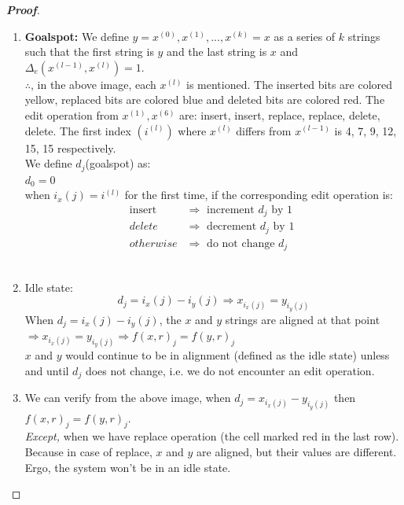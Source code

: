 \documentclass{article}
\begin{document}
\begin{proof}[\textbf{Proof}]
\begin{enumerate}
        \item \textbf{Goalspot:}
        We define $y=x^{(0)},x^{(1)},...,x^{(k)}=x$ as a series of $k$ strings
        such that the first string is $y$ and the last string is $x$ and 
        $\Delta_e(x^{(l-1)},x^{(l)})=1$.\\
        $\therefore$, in the above image, each $x^{(l)}$ is mentioned. The
        inserted bits are colored yellow, replaced bits are colored blue and 
        deleted bits are colored red. The edit operation from $x^{(1)},x^{(6)}$
        are: insert, insert, replace, replace, delete, delete. The first index $(i^{(l)})$
        where $x^{(l)}$ differs from $x^{(l-1)}$ is 4, 7, 9, 12, 15, 15 respectively.\\
        We define $d_j$(goalspot) as:\\
        $d_0=0$ \\
        when $i_x(j)=i^{(l)}$ for the first time, if the corresponding edit
        operation is:\\
        \begin{align}
            \text{insert } &\Longrightarrow \text{ increment } d_j \text{ by 1} \nonumber\\ 
            delete &\Longrightarrow \text{ decrement } d_j \text{ by 1 } \nonumber\\
            otherwise &\Longrightarrow \text{ do not change } d_j \nonumber
        \end{align}
        \\
        \item Idle state:
        \begin{equation}
        \label{idle}
         d_j=i_x(j)-i_y(j) \Longrightarrow x_{i_x(j)}=y_{i_y(j)}    
        \end{equation}
        When $d_j=i_x(j)-i_y(j)$, the $x$ and $y$ strings are aligned at 
        that point $\Longrightarrow x_{i_x(j)}=y_{i_y(j)} \Longrightarrow f(x,r)_j=f(y,r)_j$\\
        $x$ and $y$ would continue to be in alignment (defined as the idle state)
        unless and until $d_j$ does not change, i.e. we do not 
        encounter an edit operation.\\

        \item We can verify from the above image, when $d_j=x_{i_x(j)}-y_{i_y(j)}$
        then $f(x,r)_j=f(y,r)_j$.\\
        \textit{Except,} when we have replace operation (the cell marked red in 
        the last row). Because in case of replace, $x$ and $y$ are aligned, but
        their values are different. Ergo, the system won't be in an idle state.


\end{enumerate}
\end{proof}
\end{document}
